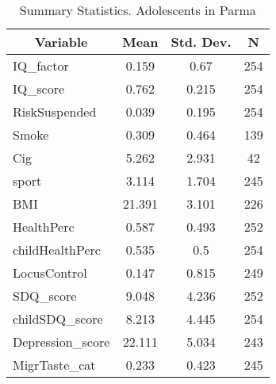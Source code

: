 
\begin{table}[htbp]\centering \caption{Summary Statistics. Adolescents in Parma \label{cityAdolParma}}
\begin{tabular}{l c c  c}\hline\hline
\multicolumn{1}{c}{\textbf{Variable}} & \textbf{Mean}
 & \textbf{Std. Dev.} & \textbf{N}\\ \hline
IQ\_factor & 0.159 & 0.67  & 254\\
IQ\_score & 0.762 & 0.215  & 254\\
RiskSuspended & 0.039 & 0.195  & 254\\
Smoke & 0.309 & 0.464  & 139\\
Cig & 5.262 & 2.931  & 42\\
sport & 3.114 & 1.704  & 245\\
BMI & 21.391 & 3.101  & 226\\
HealthPerc & 0.587 & 0.493  & 252\\
childHealthPerc & 0.535 & 0.5  & 254\\
LocusControl & 0.147 & 0.815  & 249\\
SDQ\_score & 9.048 & 4.236  & 252\\
childSDQ\_score & 8.213 & 4.445  & 254\\
Depression\_score & 22.111 & 5.034  & 243\\
MigrTaste\_cat & 0.233 & 0.423  & 245\\
\hline\end{tabular}
\end{table}

